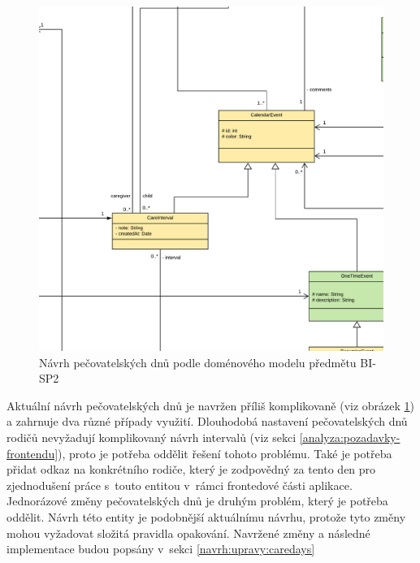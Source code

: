         \begin{figure}\centering
            \includegraphics[width=1.0\textwidth]{pdfs/CareDays1}
            \caption[Předešlý návrh pečovatelských dnů]{Návrh pečovatelských dnů podle doménového modelu předmětu BI-SP2}\label{image:caredays1}
        \end{figure}
        Aktuální návrh pečovatelských dnů je navržen příliš komplikovaně (viz obrázek \ref{image:caredays1}) a zahrnuje dva různé případy využití. Dlouhodobá nastavení pečovatelských dnů rodičů nevyžadují komplikovaný návrh intervalů (viz sekci \ref{analyza:pozadavky-frontendu}), proto je potřeba oddělit řešení tohoto problému. Také je potřeba přidat odkaz na konkrétního rodiče, který je zodpovědný za tento den pro zjednodušení práce s~touto entitou v~rámci frontedové části aplikace. Jednorázové změny pečovatelských dnů je druhým problém, který je potřeba oddělit. Návrh této entity je podobnější aktuálnímu návrhu, protože tyto změny mohou vyžadovat složitá pravidla opakování. Navržené změny a následné implementace budou popsány v~sekci \ref{navrh:upravy:caredays}
        
